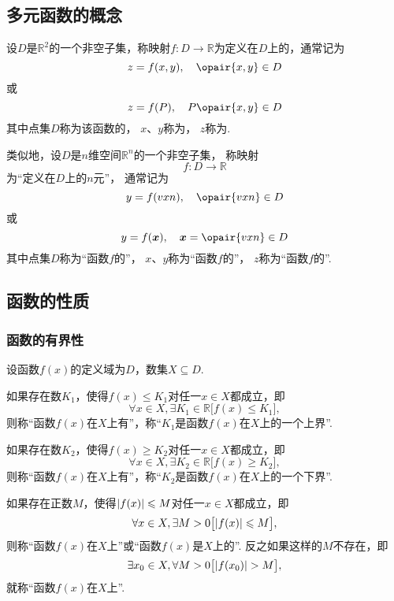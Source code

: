 \subsection{多元函数的概念}
\begin{definition}
设\(D\)是\(\mathbb{R}^2\)的一个非空子集，称映射\(f\colon D \to \mathbb{R}\)为定义在\(D\)上的，通常记为\[
z = f(x,y),
\quad \opair{x,y} \in D
\]或\[
z = f(P),
\quad P\opair{x,y} \in D
\]其中点集\(D\)称为该函数的，
\(x\)、\(y\)称为，
\(z\)称为.
\end{definition}

\begin{definition}
类似地，设\(D\)是\(n\)维空间\(\mathbb{R}^n\)的一个非空子集，
称映射\[
	f\colon D \to \mathbb{R}
\]
为“定义在\(D\)上的\(n\)元”，
通常记为\[
	y = f(\v{x}{n}),
	\quad \opair{\v{x}{n}} \in D
\]或\[
	y = f(\mat{x}),
	\quad \mat{x}=\opair{\v{x}{n}} \in D
\]
其中点集\(D\)称为“函数\(f\)的”，
\(x\)、\(y\)称为“函数\(f\)的”，
\(z\)称为“函数\(f\)的”.
\end{definition}

\subsection{函数的性质}
\subsubsection{函数的有界性}
\begin{definition}\label{definition:函数.函数的有界性}
设函数\(f(x)\)的定义域为\(D\)，数集\(X \subseteq D\).

如果存在数\(K_1\)，使得\(f(x) \leqslant K_1\)对任一\(x \in X\)都成立，即\[
\forall x \in X, \exists K_1 \in \mathbb{R} \bigl[
	f(x) \leqslant K_1
\bigr],
\]则称“函数\(f(x)\)在\(X\)上有”，称“\(K_1\)是函数\(f(x)\)在\(X\)上的一个上界”.

如果存在数\(K_2\)，使得\(f(x) \geqslant K_2\)对任一\(x \in X\)都成立，即\[
\forall x \in X, \exists K_2 \in \mathbb{R} \bigl[
	f(x) \geqslant K_2
\bigr],
\]则称“函数\(f(x)\)在\(X\)上有”，称“\(K_2\)是函数\(f(x)\)在\(X\)上的一个下界”.

如果存在正数\(M\)，使得\(\abs{f(x)} \leqslant M\)对任一\(x \in X\)都成立，即\[
\forall x \in X, \exists M>0 \bigl[
	\abs{f(x)} \leqslant M
\bigr],
\]则称“函数\(f(x)\)在\(X\)上”或“函数\(f(x)\)是\(X\)上的”.
反之如果这样的\(M\)不存在，即\[
\exists x_0 \in X, \forall M>0 \bigl[
	\abs{f(x_0)} > M
\bigr],
\]就称“函数\(f(x)\)在\(X\)上”.
\end{definition}

